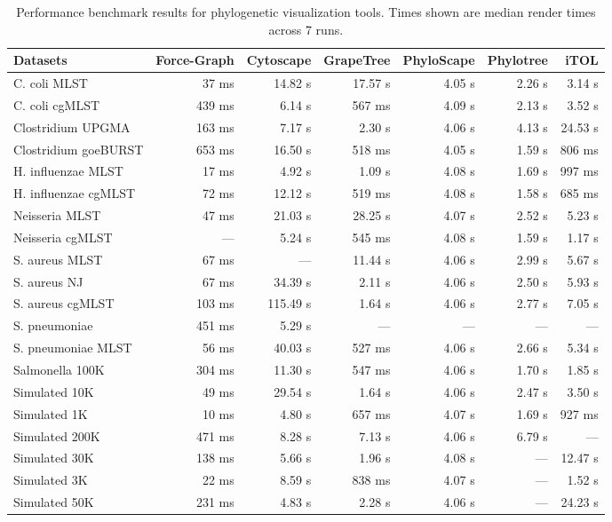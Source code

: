 \begin{table}[htbp]
    \centering
    \caption{Performance benchmark results for phylogenetic visualization tools. Times shown are median render times across 7 runs.}
    \label{tab:benchmark_results}
    \small
    \begin{tabular}{lrrrrrr}
        \toprule
        Datasets & Force-Graph & Cytoscape & GrapeTree & PhyloScape & Phylotree & iTOL \\
        \midrule
        C. coli MLST & 37 ms & 14.82 s & 17.57 s & 4.05 s & 2.26 s & 3.14 s \\
        C. coli cgMLST & 439 ms & 6.14 s & 567 ms & 4.09 s & 2.13 s & 3.52 s \\
        Clostridium UPGMA & 163 ms & 7.17 s & 2.30 s & 4.06 s & 4.13 s & 24.53 s \\
        Clostridium goeBURST & 653 ms & 16.50 s & 518 ms & 4.05 s & 1.59 s & 806 ms \\
        H. influenzae MLST & 17 ms & 4.92 s & 1.09 s & 4.08 s & 1.69 s & 997 ms \\
        H. influenzae cgMLST & 72 ms & 12.12 s & 519 ms & 4.08 s & 1.58 s & 685 ms \\
        Neisseria MLST & 47 ms & 21.03 s & 28.25 s & 4.07 s & 2.52 s & 5.23 s \\
        Neisseria cgMLST & --- & 5.24 s & 545 ms & 4.08 s & 1.59 s & 1.17 s \\
        S. aureus MLST & 67 ms & --- & 11.44 s & 4.06 s & 2.99 s & 5.67 s \\
        S. aureus NJ & 67 ms & 34.39 s & 2.11 s & 4.06 s & 2.50 s & 5.93 s \\
        S. aureus cgMLST & 103 ms & 115.49 s & 1.64 s & 4.06 s & 2.77 s & 7.05 s \\
        S. pneumoniae & 451 ms & 5.29 s & --- & --- & --- & --- \\
        S. pneumoniae MLST & 56 ms & 40.03 s & 527 ms & 4.06 s & 2.66 s & 5.34 s \\
        Salmonella 100K & 304 ms & 11.30 s & 547 ms & 4.06 s & 1.70 s & 1.85 s \\
        Simulated 10K & 49 ms & 29.54 s & 1.64 s & 4.06 s & 2.47 s & 3.50 s \\
        Simulated 1K & 10 ms & 4.80 s & 657 ms & 4.07 s & 1.69 s & 927 ms \\
        Simulated 200K & 471 ms & 8.28 s & 7.13 s & 4.06 s & 6.79 s & --- \\
        Simulated 30K & 138 ms & 5.66 s & 1.96 s & 4.08 s & --- & 12.47 s \\
        Simulated 3K & 22 ms & 8.59 s & 838 ms & 4.07 s & --- & 1.52 s \\
        Simulated 50K & 231 ms & 4.83 s & 2.28 s & 4.06 s & --- & 24.23 s \\
        \bottomrule
    \end{tabular}
\end{table}